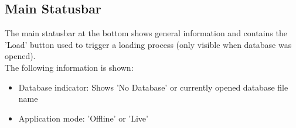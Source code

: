 



\subsection{Main Statusbar}

The main statusbar at the bottom shows general information and contains the 'Load' button used to trigger a loading process (only visible when database was opened). \\

The following information is shown:

\begin{itemize}
 \item Database indicator: Shows 'No Database' or currently opened database file name
 \item Application mode: 'Offline' or 'Live'
\end{itemize}
\  \\






